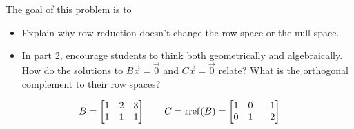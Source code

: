 \documentclass{problemset}
\newcommand{\bookonlynewpage}{\begin{bookonly}\newpage\end{bookonly}}
\begin{document}
	\bookonlynewpage
	\question
	\begin{annotation}
		\begin{goals}

			The goal of this problem is to
			\begin{itemize}
				\item Explain why row reduction doesn't change the row space or the null space.
			\end{itemize}
		\end{goals}

		\begin{notes}
			\begin{itemize}
				\item In part 2, encourage students to think both geometrically
					and algebraically. How do the solutions to $B\vec x=\vec 0$ and
					$C\vec x=\vec 0$ relate? What is the orthogonal complement to their row
					spaces?
			\end{itemize}
		\end{notes}
	\end{annotation}
	\[
		B=\mat{1&2&3\\1&1&1}\qquad C=\rref(B)=\mat{1&0&-1\\0&1&2}
	\]
\end{document}
